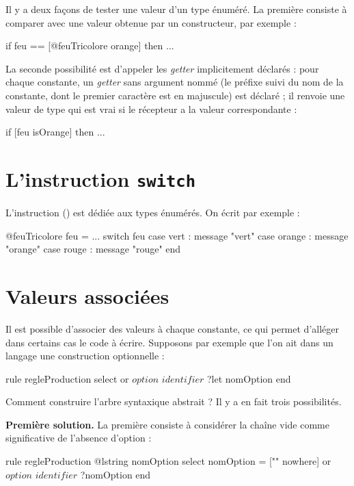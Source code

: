 
Il y a deux façons de tester une valeur d'un type énuméré. La première consiste à comparer avec une valeur obtenue par un constructeur, par exemple :
\begin{galgascode}
  if feu == [@feuTricolore orange] then ...
\end{galgascode}

La seconde possibilité est d'appeler les \emph{getter} implicitement déclarés : pour chaque constante, un \emph{getter} sans argument nommé   (le préfixe  suivi du nom de la constante, dont le premier caractère est en majuscule) est déclaré ; il renvoie une valeur de type  qui est vrai si le récepteur a la valeur correspondante :
\begin{galgascode}
  if [feu isOrange] then ...
\end{galgascode}

\section{L'instruction \texttt{switch}}

L'instruction  () est dédiée aux types énumérés. On écrit par exemple :

\begin{galgascode}
@feuTricolore feu = ...
switch feu
case vert : message "vert"
case orange : message "orange"
case rouge : message "rouge" 
end
\end{galgascode}


\section{Valeurs associées}

Il est possible d'associer des valeurs à chaque constante, ce qui permet d'alléger dans certains cas le code à écrire. Supposons par exemple que l'on ait dans un langage une construction optionnelle :

\begin{galgascode}
rule regleProduction {
  select
  or
    $option$
    $identifier$ ?let nomOption
  end
}
\end{galgascode}

Comment construire l'arbre syntaxique abstrait ? Il y a en fait trois possibilités.

\textbf{Première solution.} La première consiste à considérer la chaîne vide comme significative de l'absence d'option :
\begin{galgascode}
rule regleProduction {
  @lstring nomOption
  select
    nomOption = ["" nowhere]
  or
    $option$
    $identifier$ ?nomOption
  end
}
\end{galgascode}

